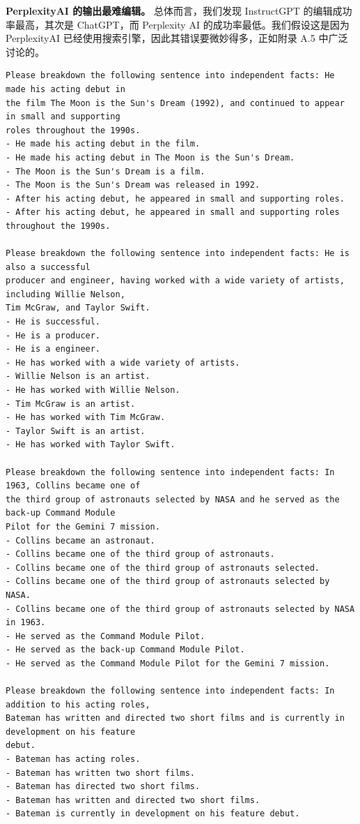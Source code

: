 \documentclass[11pt,UTF8,fontset=fandol]{ctexart}
\begin{document}
\textbf{PerplexityAI 的输出最难编辑。} 总体而言，我们发现 InstructGPT 的编辑成功率最高，其次是 ChatGPT，而 Perplexity AI 的成功率最低。我们假设这是因为 PerplexityAI 已经使用搜索引擎，因此其错误要微妙得多，正如附录 A.5 中广泛讨论的。

\begin{table}[H]\centering
\caption{给 InstructGPT 用以为给定句子生成原子事实的提示。模型生成的原子事实由人类编辑修订。}
\label{tab:15}
\end{table}

\begin{Verbatim}[fontsize=\scriptsize,frame=single]
Please breakdown the following sentence into independent facts: He made his acting debut in
the film The Moon is the Sun's Dream (1992), and continued to appear in small and supporting
roles throughout the 1990s.
- He made his acting debut in the film.
- He made his acting debut in The Moon is the Sun's Dream.
- The Moon is the Sun's Dream is a film.
- The Moon is the Sun's Dream was released in 1992.
- After his acting debut, he appeared in small and supporting roles.
- After his acting debut, he appeared in small and supporting roles throughout the 1990s.

Please breakdown the following sentence into independent facts: He is also a successful
producer and engineer, having worked with a wide variety of artists, including Willie Nelson,
Tim McGraw, and Taylor Swift.
- He is successful.
- He is a producer.
- He is a engineer.
- He has worked with a wide variety of artists.
- Willie Nelson is an artist.
- He has worked with Willie Nelson.
- Tim McGraw is an artist.
- He has worked with Tim McGraw.
- Taylor Swift is an artist.
- He has worked with Taylor Swift.

Please breakdown the following sentence into independent facts: In 1963, Collins became one of
the third group of astronauts selected by NASA and he served as the back-up Command Module
Pilot for the Gemini 7 mission.
- Collins became an astronaut.
- Collins became one of the third group of astronauts.
- Collins became one of the third group of astronauts selected.
- Collins became one of the third group of astronauts selected by NASA.
- Collins became one of the third group of astronauts selected by NASA in 1963.
- He served as the Command Module Pilot.
- He served as the back-up Command Module Pilot.
- He served as the Command Module Pilot for the Gemini 7 mission.

Please breakdown the following sentence into independent facts: In addition to his acting roles,
Bateman has written and directed two short films and is currently in development on his feature
debut.
- Bateman has acting roles.
- Bateman has written two short films.
- Bateman has directed two short films.
- Bateman has written and directed two short films.
- Bateman is currently in development on his feature debut.


\end{Verbatim}
\end{document}
